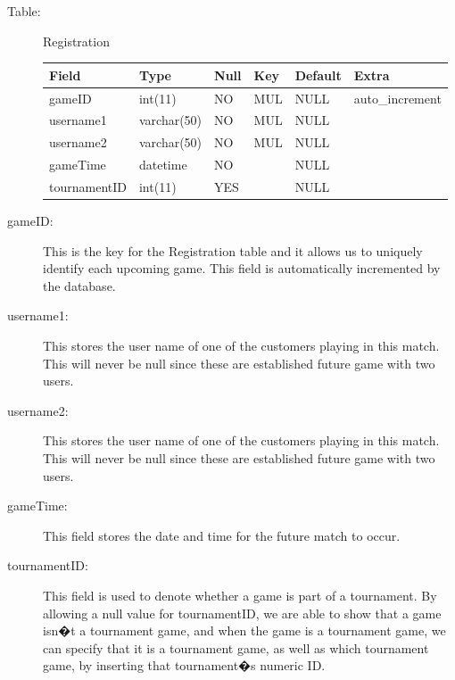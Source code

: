 \begin{description}

\item[Table:] Registration

\begin{center}
    \begin{tabular}{ | l | l | l | l | l | l|}
    \hline
    Field & Type & Null & Key & Default & Extra \\ \hline \hline
    gameID & int(11) & NO & MUL & NULL & auto\_increment \\ \hline
    username1 & varchar(50) & NO & MUL & NULL &\hspace{1 pc}  \\ \hline
    username2 & varchar(50) & NO & MUL& NULL &\hspace{1 pc}  \\ \hline
    gameTime & datetime & NO &\hspace{1 pc} & NULL &\hspace{1 pc}  \\ \hline
    tournamentID & int(11) & YES &\hspace{1 pc} & NULL &\hspace{1 pc}   \\
    \hline
    \end{tabular}
\end{center}

\item[gameID:] This is the key for the Registration table and it allows us to uniquely identify each upcoming game. This field is automatically incremented by the database.
\item[username1:] This stores the user name of one of the customers playing in this match. This will never be null since these are established future game with two users.
\item[username2:] This stores the user name of one of the customers playing in this match. This will never be null since these are established future game with two users.
\item[gameTime:] This field stores the date and time for the future match to occur.
\item[tournamentID:] This field is used to denote whether a game is part of a tournament. By allowing a null value for tournamentID, we are able to show that a game isn�t a tournament game, and when the game is a tournament game, we can specify that it is a tournament game, as well as  which tournament game, by inserting that tournament�s numeric ID.
\end{description}


